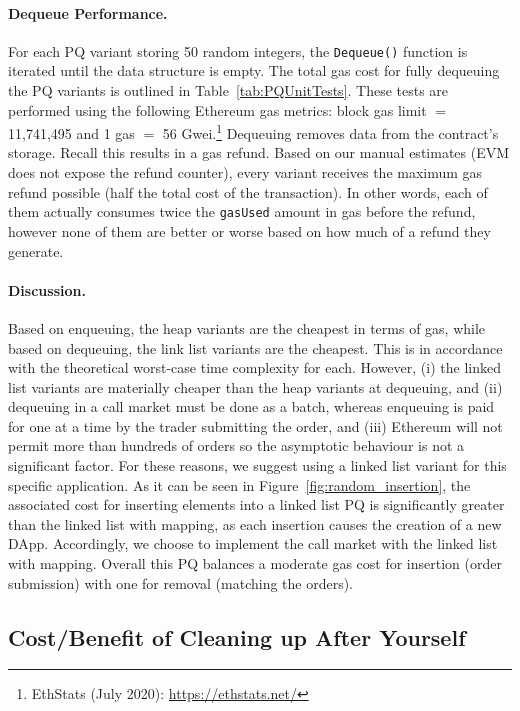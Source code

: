 \paragraph{Dequeue Performance.} For each PQ variant storing 50 random integers, the \texttt{Dequeue()} function is iterated until the data structure is empty. The total gas cost for fully dequeuing the PQ variants is outlined in Table~\ref{tab:PQUnitTests}. These tests are performed using the following Ethereum gas metrics: block gas limit $=$11,741,495 and 1 gas $=$ 56 Gwei.\footnote{EthStats (July 2020): \url{https://ethstats.net/}} Dequeuing removes data from the contract's storage. Recall this results in a gas refund. Based on our manual estimates (EVM does not expose the refund counter), every variant receives the maximum gas refund possible (\ie half the total cost of the transaction). In other words, each of them actually consumes twice the \texttt{gasUsed} amount in gas before the refund, however none of them are better or worse based on how much of a refund they generate.  

\paragraph{Discussion.} Based on enqueuing, the heap variants are the cheapest in terms of gas, while based on dequeuing, the link list variants are the cheapest. This is in accordance with the theoretical worst-case time complexity for each. However, (i) the linked list variants are materially cheaper than the heap variants at dequeuing, and (ii) dequeuing in a call market must be done as a batch, whereas enqueuing is paid for one at a time by the trader submitting the order, and (iii) Ethereum will not permit more than hundreds of orders so the asymptotic behaviour is not a significant factor. For these reasons, we suggest using a linked list variant for this specific application. As it can be seen in Figure~\ref{fig:random_insertion}, the associated cost for inserting elements into a linked list PQ is significantly greater than the linked list with mapping, as each insertion causes the creation of a new DApp. Accordingly, we choose to implement the call market with the linked list with mapping. Overall this PQ balances a moderate gas cost for insertion (\ie order submission) with one for removal (\ie matching the orders). 


\subsection{Cost/Benefit of Cleaning up After Yourself}
\label{sec:gasrefund}

